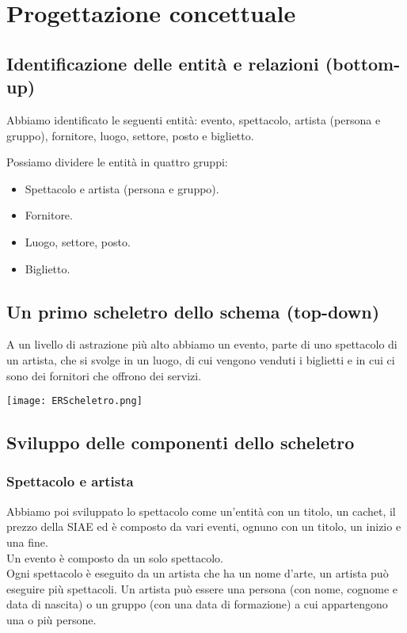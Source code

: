 \documentclass[a4paper,11pt]{article}
\begin{document}
\section{Progettazione concettuale}

\subsection{Identificazione delle entità e relazioni (bottom-up)}

Abbiamo identificato le seguenti entità: evento, spettacolo, artista (persona e gruppo), fornitore, luogo, settore, posto e biglietto.

Possiamo dividere le entità in quattro gruppi:

\begin{itemize}
    \item Spettacolo e artista (persona e gruppo).
    \item Fornitore.
    \item Luogo, settore, posto.
    \item Biglietto.
\end{itemize}

\pagebreak
\subsection{Un primo scheletro dello schema (top-down)}

A un livello di astrazione più alto abbiamo un evento, parte di uno spettacolo di un artista, che si svolge in un luogo, di cui vengono venduti i biglietti e in cui ci sono dei fornitori che offrono dei servizi.

\vspace*{1em}
\texttt{[image: ERScheletro.png]}
 
\subsection{Sviluppo delle componenti dello scheletro}

\subsubsection*{Spettacolo e artista}

Abbiamo poi sviluppato lo spettacolo come un'entità con un titolo, un cachet, il prezzo della SIAE ed è composto da vari eventi, ognuno con un titolo, un inizio e una fine.\\
Un evento è composto da un solo spettacolo.\\
Ogni spettacolo è eseguito da un artista che ha un nome d'arte, un artista può eseguire più spettacoli.
Un artista può essere una persona (con nome, cognome e data di nascita) o un gruppo (con una data di formazione) a cui appartengono una o più persone.
\end{document}
